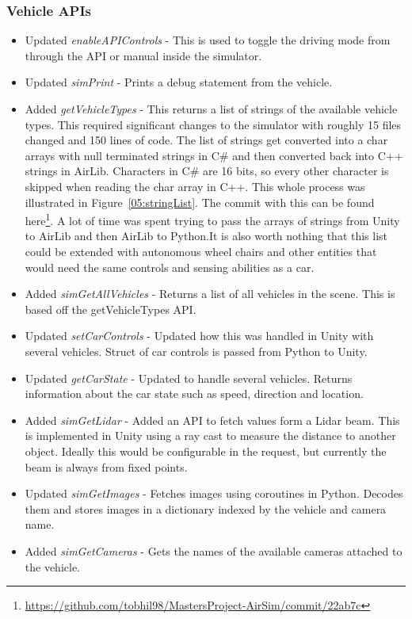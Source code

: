 \subsubsection{Vehicle APIs}
\begin{itemize}
    \item Updated \emph{enableAPIControls} - This is used to toggle the driving mode from through the API or manual inside the simulator.
    \item Updated \emph{simPrint} - Prints a debug statement from the vehicle.
    \item Added \emph{getVehicleTypes} - This returns a list of strings of the available vehicle types. This required significant changes to the simulator with roughly 15 files changed and 150 lines of code. The list of strings get converted into a char arrays with null terminated strings in C\# and then converted back into C++ strings in AirLib. Characters in C# are 16 bits, so every other character is skipped when reading the char array in C++.  This whole process was illustrated in Figure~\ref{05:stringList}. The commit with this can be found here\footnote{\url{https://github.com/tobhil98/MastersProject-AirSim/commit/22ab7c}}. A lot of time was spent trying to pass the arrays of strings from Unity to AirLib and then AirLib to Python.It is also worth nothing that this list could be extended with autonomous wheel chairs and other entities that would need the same controls and sensing abilities as a car. 
    \item Added \emph{simGetAllVehicles} - Returns a list of all vehicles in the scene. This is based off the getVehicleTypes API. 
    \item Updated \emph{setCarControls} - Updated how this was handled in Unity with several vehicles. Struct of car controls is passed from Python to Unity. 
    \item Updated \emph{getCarState} - Updated to handle several vehicles. Returns information about the car state such as speed, direction and location. 
    \item Added \emph{simGetLidar} - Added an API to fetch values form a Lidar beam. This is implemented in Unity using a ray cast to measure the distance to another object. Ideally this would be configurable in the request, but currently the beam is always from fixed points. 
    \item Updated \emph{simGetImages} - Fetches images using coroutines in Python. Decodes them and stores images in a dictionary indexed by the vehicle and camera name.
    \item Added \emph{simGetCameras} - Gets the names of the available cameras attached to the vehicle. 
\end{itemize}

